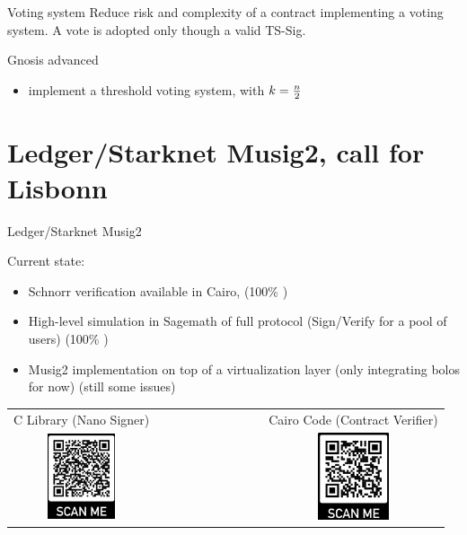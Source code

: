 \documentclass[aspectratio=43]{beamer}
\begin{document}
\begin{frame}{Voting system}
Reduce risk and complexity of a contract implementing a voting system.
A vote is adopted only though a valid TS-Sig.

\begin{exampleblock}{Gnosis advanced}
\begin{itemize}
\item implement a threshold voting system, with $k={n\over 2}$
\end{itemize}
\end{exampleblock}


\end{frame} 

\section{Ledger/Starknet Musig2, call for Lisbonn}


\begin{frame}{Ledger/Starknet Musig2}


Current state:
\begin{itemize}
\item Schnorr verification available in Cairo, (100\% )
\item High-level simulation in Sagemath of full protocol (Sign/Verify for a pool of users) (100\% )
\item Musig2 implementation on top of a virtualization layer (only integrating bolos for now) (still some issues)
\end{itemize} 

     
            \begin{tabular}{ccc}
           C Library (Nano Signer) &~~~~~~~~~~~~~~~ &   Cairo Code (Contract Verifier)\\
            
           \includegraphics[width=2cm]{images/musig2_qr.jpg} & ~~~~~~~~~~~~~~~&\includegraphics[width=2.1cm]{images/cairomusig2_qr.jpg}
            \\
           \end{tabular}     		
\end{frame} 
\end{document}
